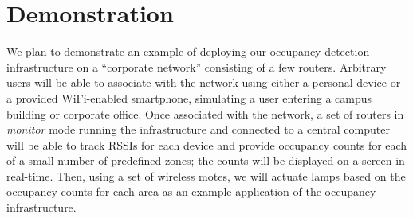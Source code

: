\section{Demonstration}
We plan to demonstrate an example of deploying our occupancy detection infrastructure on a ``corporate network'' consisting of a few routers. Arbitrary users will be able to associate with the network using either a personal device or a provided WiFi-enabled smartphone, simulating a user entering a campus building or corporate office. Once associated with the network, a set of routers in \emph{monitor} mode running the infrastructure and connected to a central computer will be able to track RSSIs for each device and provide occupancy counts for each of a small number of predefined zones; the counts will be displayed on a screen in real-time. Then, using a set of wireless motes, we will actuate lamps based on the occupancy counts for each area as an example application of the occupancy infrastructure.
